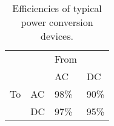 \begin{table}[]
\centering
\caption{Efficiencies of typical power conversion devices.}
\label{tab:conv_eff}
\begin{tabular}{|ll|l|l|}
\hline
	&				& \multicolumn{1}{l}{From}	&				\\ \cline{3-4} 
	&				& AC				& DC				\\ \hline 
To	& \multicolumn{1}{|l|}{AC}	& 98\% \cite{Starke2008}	& 90\% \cite{Pang2006}	\\ \cline{2-4} 
	& \multicolumn{1}{|l|}{DC}	& 97\% \cite{Starke2008}	& 95\% \cite{Starke2008}	\\ \hline
\end{tabular}
\end{table}
